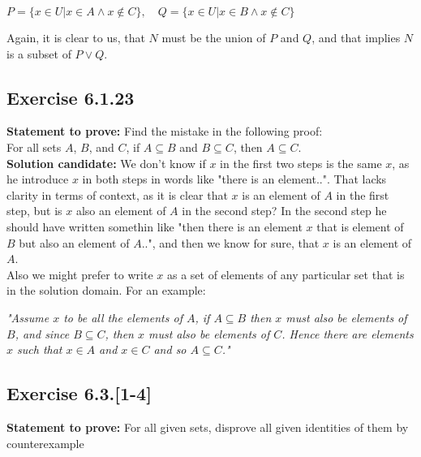 \documentclass{report}
\newcommand{\cent}[1]{\begin{center}#1\end{center}}
\newcommand{\In}{\! \in \!}
\newcommand{\Prove}{\textbf{Statement to prove: }}
\newcommand{\Solution}{\textbf{Solution candidate: }}
\newcommand{\QED}{\boxed{}}
\newcommand{\Exercise}[1]{\subsection{Exercise #1}}
\begin{document}
	\cent{$P = \{x \In U | x \In A \wedge x \notin C\}, \quad Q = \{x \In U | x \In B \wedge x \notin C\}$}
	
	Again, it is clear to us, that $N$ must be the union of $P$ and $Q$, and that implies $N$ is a subset of $P \vee Q$.\\
	\QED
	
	\Exercise{6.1.23}
	
	\Prove
	Find the mistake in the following proof:\\
	
	For all sets $A$, $ B $, and $ C $, if $ A \subseteq B $ and $ B \subseteq C $, then $ A \subseteq C $.\\
	
	\Solution
	We don't know if $x$ in the first two steps is the same $x$, as he introduce $x$ in both steps in words like  "there is an element..". That lacks clarity in terms of context, as it is clear that $x$ is an element of  $A$ in the first step, but is $x$ also an element of $A$ in the second step? In the second step he should have written somethin like "then there is an element $ x $ that is element of $ B $ but also an element of $ A $..", and then we know for sure, that $x$ is an element of $A$.\\
	
	Also we might prefer to write $x$ as a set of elements of any particular set that is in the solution domain. For an example:
	
	\begin{center}
		\textit{"Assume $ x $ to be all the elements of $ A $, if $ A \subseteq B$ then $x$ must also be elements of $B$, and since $B \subseteq C$, then $x$ must also be elements of $C$. Hence there are elements $x$ such that $ x \In A $ and $ x \In C $ and so $ A \subseteq C $."}
	\end{center}

	\Exercise{6.3.[1-4]}
	
	\Prove
	For all given sets, disprove all given identities of them by counterexample
	
\end{document}
